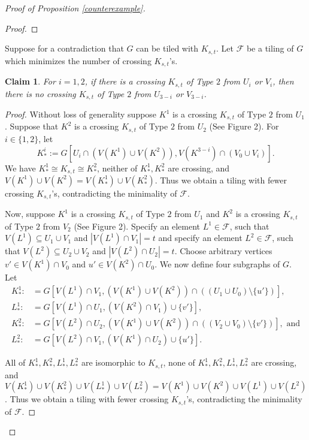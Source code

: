 \documentclass[oneside,12pt]{memoir}
\newtheorem{claim}[theorem]{Claim}
\begin{document}
\begin{proof}[Proof of Proposition \ref{counterexample}]
\begin{proof}
\end{proof}

Suppose for a contradiction that $G$ can be tiled with $K_{s,t}$.  Let $\mathcal{F}$ be a tiling of $G$ which minimizes the number of crossing $K_{s,t}$'s.


\begin{claim}\label{forbidden}
For $i=1,2$, if there is a crossing $K_{s,t}$ of Type $2$ from $U_i$ or $V_i$, then there is no crossing $K_{s,t}$ of Type $2$ from $U_{3-i}$ or $V_{3-i}$.
\end{claim}

\begin{proof}
Without loss of generality suppose $K^1$ is a crossing $K_{s,t}$ of Type $2$ from $U_1$.  Suppose that $K^2$ is a crossing $K_{s,t}$ of Type $2$ from $U_2$ (See Figure 2). For $i\in\{1,2\}$, let 
$$K^i_*:=G[U_i\cap (V(K^1)\cup V(K^2)), V(K^{3-i})\cap (V_0\cup V_i)].$$  
We have $K^1_*\cong K_{s,t} \cong K^2_*$, neither of $K^1_*,K^2_*$ are crossing, and $V(K^1)\cup V(K^2)=V(K^1_*)\cup V(K^2_*)$. Thus we obtain a tiling with fewer crossing $K_{s,t}$'s, contradicting the minimality of $\mathcal{F}$.

Now, suppose $K^1$ is a crossing $K_{s,t}$ of Type $2$ from $U_1$ and $K^2$ is a crossing $K_{s,t}$ of Type $2$ from $V_2$ (See Figure 2). Specify an element $L^1\in\mathcal{F}$, such that $V(L^1)\subseteq U_1\cup V_1$ and $|V(L^1)\cap V_1|=t$ and specify an element $L^2\in\mathcal{F}$, such that $V(L^2)\subseteq U_2\cup V_2$ and $|V(L^2)\cap U_2|=t$.  Choose arbitrary vertices $v'\in V(K^1)\cap V_0$ and $u'\in V(K^2)\cap U_0$.  We now define four subgraphs of $G$.  Let
\begin{align*}
K^1_*:&=G[V(L^1)\cap V_1, (V(K^1)\cup V(K^2))\cap ((U_1\cup U_0)\setminus\{u'\})],\\
L^1_*:&=G[V(L^1)\cap U_1, (V(K^2)\cap V_1)\cup\{v'\}],\\
K^2_*:&=G[V(L^2)\cap U_2, (V(K^1)\cup V(K^2))\cap ((V_2\cup V_0)\setminus\{v'\})], \text{ and}\\
L^2_*:&=G[V(L^2)\cap V_1, (V(K^1)\cap U_2)\cup\{u'\}]. 
\end{align*}

All of $K^1_*,K^2_*,L^1_*,L^2_*$ are isomorphic to $K_{s,t}$, none of $K^1_*,K^2_*,L^1_*,L^2_*$ are crossing, and $V(K^1_*)\cup V(K^2_*)\cup V(L^1_*)\cup V(L^2_*)=V(K^1)\cup V(K^2)\cup V(L^1)\cup V(L^2)$. Thus we obtain a tiling with fewer crossing $K_{s,t}$'s, contradicting the minimality of $\mathcal{F}$.
\end{proof}


\end{proof}
\end{document}
